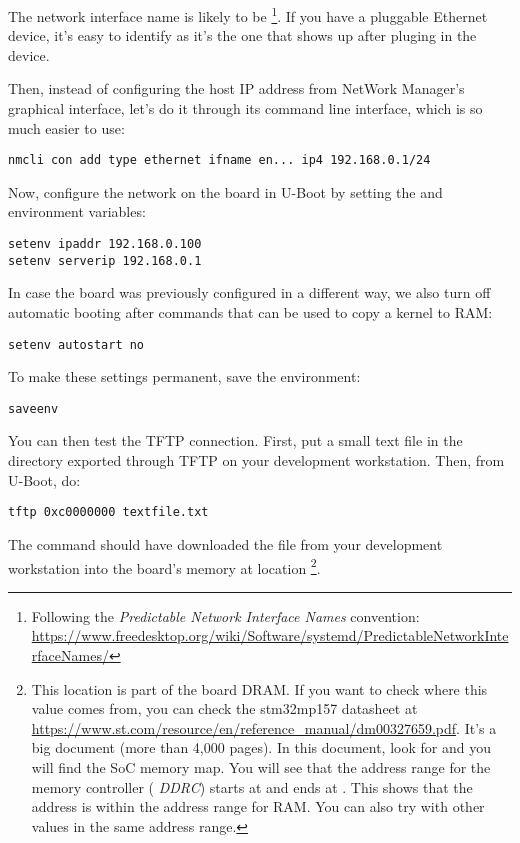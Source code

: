 The network interface name is likely to be
\footnote{Following the {\em Predictable Network Interface
Names} convention:
\url{https://www.freedesktop.org/wiki/Software/systemd/PredictableNetworkInterfaceNames/}}.
If you have a pluggable Ethernet device, it's easy to identify as it's
the one that shows up after pluging in the device.

Then, instead of configuring the host IP address from NetWork Manager’s graphical interface,
let’s do it through its command line interface, which is so much easier to use:

\begin{verbatim}
nmcli con add type ethernet ifname en... ip4 192.168.0.1/24
\end{verbatim}

Now, configure the network on the board in U-Boot by setting the 
and  environment variables:

\begin{verbatim}
setenv ipaddr 192.168.0.100
setenv serverip 192.168.0.1
\end{verbatim}

In case the board was previously configured in a different way, we
also turn off automatic booting after commands that can be used to
copy a kernel to RAM:

\begin{verbatim}
setenv autostart no
\end{verbatim}

To make these settings permanent, save the environment:

\begin{verbatim}
saveenv
\end{verbatim}

You can then test the TFTP connection. First, put a small text file in
the directory exported through TFTP on your development
workstation. Then, from U-Boot, do:

\begin{verbatim}
tftp 0xc0000000 textfile.txt
\end{verbatim}

The  command should have downloaded the
 file from your development workstation into
the board's memory at location \footnote{
This location is part of the board DRAM. If you want
to check where this value comes from, you can check the stm32mp157
datasheet at
\url{https://www.st.com/resource/en/reference_manual/dm00327659.pdf}.
It's a big document (more than 4,000 pages). In this document, look
for  and you will find the SoC memory map.
You will see that the address range for the memory controller ({\em
DDRC}) starts at  and ends at . This
shows that the  address is within the address range
for RAM. You can also try with other values in the same address range.}.


